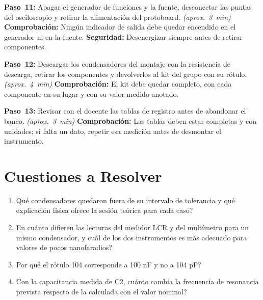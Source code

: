 \documentclass[12pt]{article}
\begin{document}
\begin{pasos}
  \item \textbf{Paso~11:} Apagar el generador de funciones y la fuente, desconectar las puntas del osciloscopio y retirar la alimentación del protoboard. \emph{(aprox.~\SI{3}{\minute})} \textbf{Comprobación:} Ningún indicador de salida debe quedar encendido en el generador ni en la fuente. \textbf{Seguridad:} Desenergizar siempre antes de retirar componentes.
  \item \textbf{Paso~12:} Descargar los condensadores del montaje con la resistencia de descarga, retirar los componentes y devolverlos al kit del grupo con su rótulo. \emph{(aprox.~\SI{4}{\minute})} \textbf{Comprobación:} El kit debe quedar completo, con cada componente en su lugar y con su valor medido anotado.
  \item \textbf{Paso~13:} Revisar con el docente las tablas de registro antes de abandonar el banco. \emph{(aprox.~\SI{3}{\minute})} \textbf{Comprobación:} Las tablas deben estar completas y con unidades; si falta un dato, repetir esa medición antes de desmontar el instrumento.
\end{pasos}

\section{Cuestiones a Resolver}\label{sec:cuestiones}
\begin{enumerate}
  \item \textquestiondown{}Qué condensadores quedaron fuera de su intervalo de tolerancia y qué explicación física ofrece la sesión teórica para cada caso?
  \item \textquestiondown{}En cuánto difieren las lecturas del medidor LCR y del multímetro para un mismo condensador, y cuál de los dos instrumentos es más adecuado para valores de pocos nanofaradios?
  \item \textquestiondown{}Por qué el rótulo \guillemotleft{}104\guillemotright{} corresponde a 100 nF y no a 104 pF?
  \item Con la capacitancia medida de C2, \textquestiondown{}cuánto cambia la frecuencia de resonancia prevista respecto de la calculada con el valor nominal?
\end{enumerate}

\end{document}
